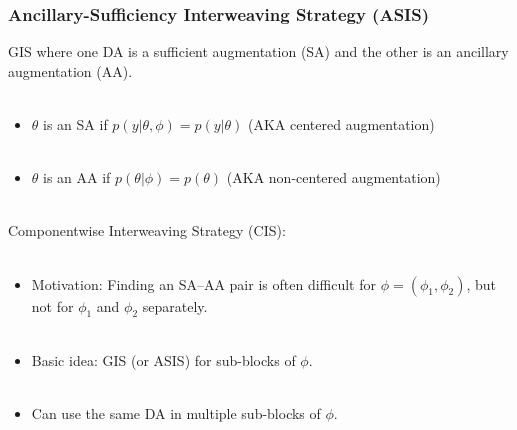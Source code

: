 \documentclass[xcolor=dvipsnames]{beamer}
\begin{document}
\begin{frame}
\frametitle{Ancillary-Sufficiency Interweaving Strategy (ASIS)}
GIS where one DA is a sufficient augmentation (SA) and the other is an ancillary augmentation (AA).\\~\\
\begin{itemize}
\item[]$\theta$ is an SA if $p(y|\theta,\phi)=p(y|\theta)$ (AKA centered augmentation)\\~\\
\item[]$\theta$ is an AA if $p(\theta|\phi)=p(\theta)$ (AKA non-centered augmentation)\\~\\
\end{itemize}
Componentwise Interweaving Strategy (CIS):\\~\\
\begin{itemize}
\item[]Motivation: Finding an SA--AA pair is often difficult for $\phi=(\phi_1,\phi_2)$, but not for $\phi_1$ and $\phi_2$ separately.\\~\\
\item[]Basic idea: GIS (or ASIS) for sub-blocks of $\phi$.\\~\\
\item[]Can use the same DA in multiple sub-blocks of $\phi$.
\end{itemize}
\end{frame}
\end{document}
